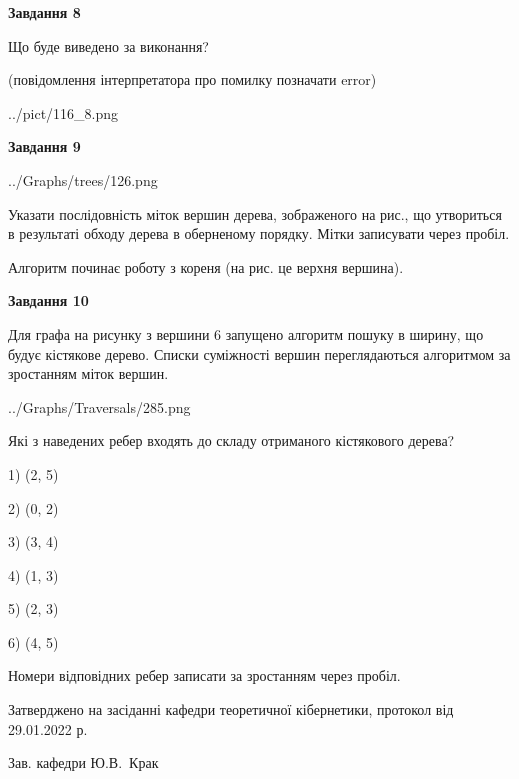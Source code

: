 \documentclass[12pt, ukrainian]{article}
\begin{document}
{\begin {large}
{\begin {center}\textbf{Завдання 8}\end {center}}\par
Що буде виведено за виконання?\par
 (повідомлення інтерпретатора про помилку позначати error)\par
\begin{center}
	{../pict/116_8.png}
\end{center}
\newpage

{\begin {center}\textbf{Завдання 9}\end {center}}\par

\begin{center}
	{../Graphs/trees/126.png}
\end{center}
Указати послідовність міток вершин дерева, зображеного на рис., що утвориться в результаті обходу дерева в оберненому порядку. Мітки записувати через пробіл.\par Алгоритм починає роботу з кореня (на рис. це верхня вершина).\par
\newpage

{\begin {center}\textbf{Завдання 10}\end {center}}\par
Для графа на рисунку з вершини 6 запущено алгоритм пошуку в ширину, що будує кістякове дерево. Списки суміжності вершин переглядаються алгоритмом за зростанням міток вершин.\par
\begin{center}
	{../Graphs/Traversals/285.png}
\end{center}
\par Які з наведених ребер входять до складу отриманого кістякового дерева?\par
1) (2, 5)\par
2) (0, 2)\par
3) (3, 4)\par
4) (1, 3)\par
5) (2, 3)\par
6) (4, 5)\par
{\vskip 15pt} Номери відповідних ребер записати за зростанням через пробіл.\par
\newpage


\end {large}
}
{\smallskip \begin {small} Затверджено на засіданні кафедри теоретичної кібернетики, протокол  від   29.01.2022 р.\par\smallskip\smallskip
{\parbox {6.5 cm}{Зав. кафедри \dotfill Ю.В.~Крак}} \end{small}}
\end{document}
